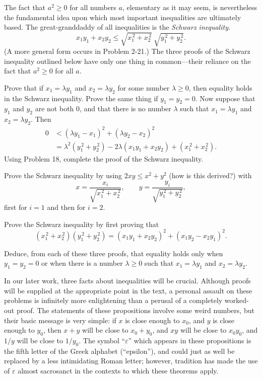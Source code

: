  The fact that $a^2 \geq 0$ for all numbers $a$, elementary as it
may seem, is nevertheless the fundamental idea upon which most important
inequalities are ultimately based. The great-granddaddy of all inequalities
is the \emph{Schwarz inequality}.
\[ x_1y_1 + x_2y_2 \leq \sqrt{x_1^{\,2} + x_2^{\,2}}\ \sqrt{y_1^{\,2} + y_2^{\,2}}. \]
(A more general form occurs in Problem 2-21.) The three proofs of the Schwarz
inequality outlined below have only one thing in common---their reliance on
the fact that $a^2 \geq 0$ for all $a$.

\begin{letters}
\item Prove that if $x_1 = \lambda y_1$ and $x_2 = \lambda y_2$ for some
  number $\lambda \geq 0$, then equality holds in the Schwarz inequality.
  Prove the same thing if $y_1 = y_2 = 0$. Now suppose that $y_1$ and $y_2$
  are not both $0$, and that there is no number $\lambda$ such that
  $x_1 = \lambda y_1$ and $x_2 = \lambda y_2$. Then
  \begin{align*}
  0 &< (\lambda y_1 - x_1)^2 + (\lambda y_2 - x_2)^2\\
    &= \lambda^2(y_1^{\,2} + y_2^{\,2}) - 2\lambda(x_1y_1 + x_2y_2)
       + (x_1^{\,2} + x_2^{\,2}).
  \end{align*}
  Using Problem 18, complete the proof of the Schwarz inequality.
\item Prove the Schwarz inequality by using $2xy \leq x^2 + y^2$ (how is this
  derived?) with
  \[
  x = \frac{x_i}{\sqrt{x_1^{\,2} + x_2^{\,2}}},
  \qquad
  y = \frac{y_i}{\sqrt{y_1^{\,2} + y_2^{\,2}}},
  \]
  first for $i = 1$ and then for $i = 2$.
\item Prove the Schwarz inequality by first proving that
  \[
  (x_1^{\,2} + x_2^{\,2})(y_1^{\,2} + y_2^{\,2})
  = (x_1y_1 + x_2y_2)^2 + (x_1y_2 - x_2y_1)^2.
  \]
\item Deduce, from each of these three proofs, that equality holds only when
  $y_1 = y_2 = 0$ or when there is a number $\lambda \geq 0$ such that
  $x_1 = \lambda y_1$ and $x_2 = \lambda y_2$.
\end{letters}

In our later work, three facts about inequalities will be crucial. Although
proofs will be supplied at the appropriate point in the text, a personal
assault on these problems is infinitely more enlightening than a perusal of a
completely worked-out proof. The statements of these propositions involve
some weird numbers, but their basic message is very simple: if $x$ is close
enough to $x_0$, and $y$ is close enough to $y_0$, then $x+y$ will be close to
$x_0 + y_0$, and $xy$ will be close to $x_0y_0$, and $1/y$ will be close to
$1/y_0$. The symbol ``$\varepsilon$'' which appears in these propositions is
the fifth letter of the Greek alphabet (``epsilon''), and could just as well
be replaced by a less intimidating Roman letter; however, tradition has made
the use of $\varepsilon$ almost sacrosanct in the contexts to which these
theorems apply.

